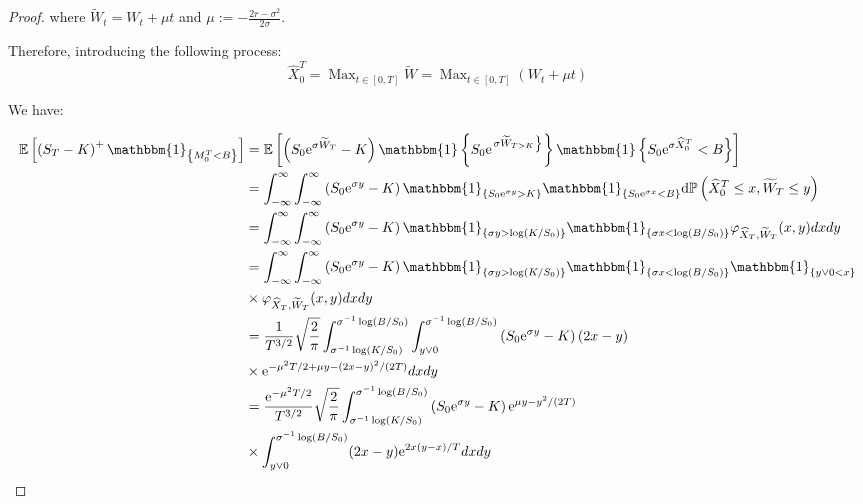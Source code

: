 \begin{appendices}
\begin{proof}
where $\widetilde{W}_{t} = W_t + \mu t$ and $\mu:=-\frac{2r-\sigma^2}{2\sigma}$.


Therefore, introducing the following process:
$$
\widehat{X}_{0}^{T}=\operatorname{Max}_{t \in[0, T]} \widetilde{W}=\operatorname{Max}_{t \in[0, T]}\left(W_{t}+\mu t\right)
$$

We have:

$$
\begin{aligned}
\mathbb{E}\left[\left(S_{T}-K\right)^{+} \mathbbm{1}_{\left\{M_{0}^{T}<B\right\}}\right]
& =\mathbb{E}\left[\left(S_{0} \mathrm{e}^{\sigma \widetilde{W}_{T}}-K\right) \mathbbm{1}\left\{S_{0} \mathrm{e}^{\left.\sigma \widetilde{W}_{T>K}\right\}}\right\} {\mathbbm{1}}\left\{S_{0} \mathrm{e}^{\sigma \widehat{X}_{0}^{T}}<B\right\}\right] \\
& =\int_{-\infty}^{\infty} \int_{-\infty}^{\infty}\left(S_{0} \mathrm{e}^{\sigma y}-K\right) \mathbbm{1}_{\left\{S_{0} \mathrm{e}^{\sigma y}>K\right\}} \mathbbm{1}_{\left\{S_{0} \mathrm{e}^{\sigma x}<B\right\}} \mathrm{d} \mathbb{P}\left(\widehat{X}_{0}^{T} \leq x, \widetilde{W}_{T} \leq y\right) \\
& =\int_{-\infty}^{\infty} \int_{-\infty}^{\infty}\left(S_{0} \mathrm{e}^{\sigma y}-K\right) \mathbbm{1}_{\left\{\sigma y>\log \left(K / S_{0}\right)\right\}} \mathbbm{1}_{\left\{\sigma x<\log \left(B / S_{0}\right)\right\}} \varphi_{\widehat{X}_{T}, \widetilde{W}_{T}}(x, y) d x d y \\
& =\int_{-\infty}^{\infty} \int_{-\infty}^{\infty}\left(S_{0} \mathrm{e}^{\sigma y}-K\right) \mathbbm{1}_{\left\{\sigma y>\log \left(K / S_{0}\right)\right\}} \mathbbm{1}_{\left\{\sigma x<\log \left(B / S_{0}\right)\right\}} \mathbbm{1}_{\{y \vee 0<x\}} \\ & \times \varphi_{\widehat{X}_{T}, \widetilde{W}_{T}}(x, y) d x d y \\
& =\frac{1}{T^{3 / 2}} \sqrt{\frac{2}{\pi}} \int_{\sigma^{-1} \log \left(K / S_{0}\right)}^{\sigma^{-1} \log \left(B / S_{0}\right)} \int_{y \vee 0}^{\sigma^{-1} \log \left(B / S_{0}\right)}\left(S_{0} \mathrm{e}^{\sigma y}-K\right)(2 x-y) \\ & \times \mathrm{e}^{-\mu^{2} T / 2+\mu y-(2 x-y)^{2} /(2 T)} d x d y \\
& =\frac{\mathrm{e}^{-\mu^{2} T / 2}}{T^{3 / 2}} \sqrt{\frac{2}{\pi}} \int_{\sigma^{-1} \log \left(K / S_{0}\right)}^{\sigma^{-1} \log \left(B / S_{0}\right)}\left(S_{0} \mathrm{e}^{\sigma y}-K\right) \mathrm{e}^{\mu y-y^{2} /(2 T)} \\
& \times \int_{y \vee 0}^{\sigma^{-1} \log \left(B / S_{0}\right)}(2 x-y) \mathrm{e}^{2 x(y-x) / T} d x d y
\end{aligned}
$$



\end{proof}
\end{appendices}
